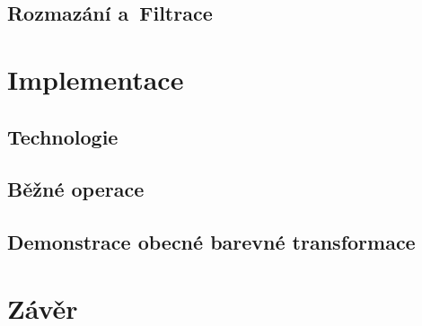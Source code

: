 \documentclass[11pt, a4paper, titlepage]{article}
\begin{document}
\subsection{Rozmazání a~Filtrace}
\section{Implementace}
\subsection{Technologie}
\subsection{Běžné operace}
\subsection{Demonstrace obecné barevné transformace}

\section{Závěr}

\newpage


\begin{flushleft}
  
\end{flushleft}

\end{document}
